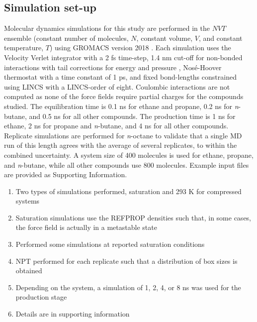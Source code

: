 \documentclass[preprint,review,12pt]{elsarticle}
\begin{document}
	
	\subsection{Simulation set-up}
	
	Molecular dynamics simulations for this study are performed in the $NVT$ ensemble (constant number of molecules, $N$, constant volume, $V$, and constant temperature, $T$) using GROMACS version 2018 \cite{GROMACS_2018}. Each simulation uses the Velocity Verlet integrator with a 2 fs time-step, 1.4 nm cut-off for non-bonded interactions with tail corrections for energy and pressure \cite{GROMACS_note}, Nos{\'e}-Hoover thermostat with a time constant of 1 ps, and fixed bond-lengths constrained using LINCS with a LINCS-order of eight. Coulombic interactions are not computed as none of the force fields require partial charges for the compounds studied. The equilibration time is 0.1 ns for ethane and propane, 0.2 ns for \textit{n}-butane, and 0.5 ns for all other compounds. The production time is 1 ns for ethane, 2 ns for propane and \textit{n}-butane, and 4 ns for all other compounds. Replicate simulations are performed for \textit{n}-octane to validate that a single MD run of this length agrees with the average of several replicates, to within the combined uncertainty. A system size of 400 molecules is used for ethane, propane, and \textit{n}-butane, while all other compounds use 800 molecules. Example input files are provided as Supporting Information.
	
	\begin{enumerate}
		\item Two types of simulations performed, saturation and 293 K for compressed systems
		\item Saturation simulations use the REFPROP densities such that, in some cases, the force field is actually in a metastable state
		\item Performed some simulations at reported saturation conditions
		\item NPT performed for each replicate such that a distribution of box sizes is obtained
		\item Depending on the system, a simulation of 1, 2, 4, or 8 ns was used for the production stage
		\item Details are in supporting information
	\end{enumerate}
	
\end{document}
